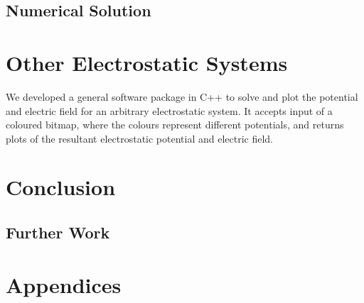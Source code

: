\documentclass[12pt, a4paper]{article}
\begin{document}
\subsection{Numerical Solution}

\section{Other Electrostatic Systems}

We developed a general software package in C++ to solve and plot the potential and
electric field for an arbitrary electrostatic system. It accepts input of a coloured
bitmap, where the colours represent different potentials, and returns plots of the
resultant electrostatic potential and electric field.

\section{Conclusion}

\subsection{Further Work}



\appendix
\section{Appendices}
\end{document}
